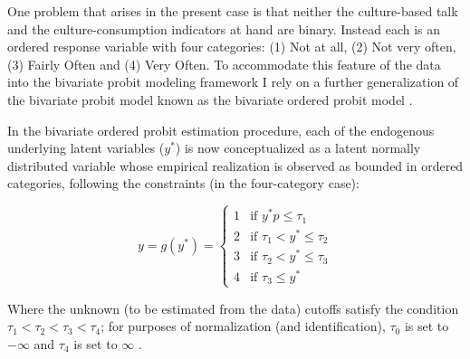 \documentclass[11pt]{article}
\begin{document}
One problem that arises in the present case is that neither the culture-based talk and the culture-consumption indicators at hand are binary. Instead each is an ordered response variable with four categories: (1) Not at all, (2) Not very often, (3) Fairly Often and (4) Very Often. To accommodate this feature of the data into the bivariate probit modeling framework I rely on a further generalization of the bivariate probit model known as the bivariate ordered probit model \citep{calhoun89}.  

 In the bivariate ordered probit estimation procedure, each of the endogenous underlying latent variables ($y^{*}$) is now conceptualized as a latent normally distributed variable whose empirical realization is observed as bounded in ordered categories, following the constraints (in the four-category case):

\begin{equation}
y=g(y^{*})=\left\{\begin{array}{rl}
  1 &\mbox{if $y^{*}p \leq \tau_{1}$} \\
  2 &\mbox{if $\tau_{1} < y^{*} \leq \tau_{2}$}\\ 
  3 &\mbox{if $\tau_{2} < y^{*} \leq \tau_{3}$}\\ 
  4 &\mbox{if $\tau_{3} \leq y^{*}$} 
 \end{array} \right.
 \label{eq3}
\end{equation}

Where the unknown (to be estimated from the data) cutoffs satisfy the condition $\tau_{1}<\tau_{2}<\tau_{3}<\tau_{4}$; for purposes of normalization (and identification), $\tau_{0}$ is set to $-\infty$ and $\tau_{4}$ is set to $\infty$ \citep{long_freese06}.
\end{document}
